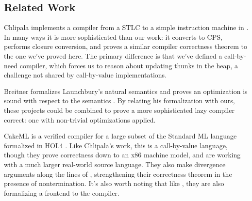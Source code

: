 \subsection{Related Work}

Chlipala implements a compiler from a STLC to a simple instruction machine in
\cite{chlipala2007certified}. In many ways it is more sophisticated than our 
work: it converts to CPS, performs closure conversion, and proves a similar
compiler correctness theorem to the one we've proved here. The primary
difference is that we've defined a call-by-need compiler, which forces us to
reason about updating thunks in the heap, a challenge not shared by
call-by-value implementations.

Breitner formalizes Launchbury's natural semantics and proves an optimization is
sound with respect to the semantics \cite{launchburynatural,breitnerthesis}. By
relating his formalization with ours, these projects could be combined to prove
a more sophisticated lazy compiler correct: one with non-trivial optimizations
applied.

CakeML \cite{cakeml14} is a verified compiler for a large subset of the Standard
ML language formalized in HOL4 \cite{slind2008brief}. Like Chlipala's work, this
is a call-by-value language, though they prove correctness down to an x86
machine model, and are working with a much larger real-world source language.
They also make divergence arguments along the lines of \cite{functionalbigstep},
strengthening their correctness theorem in the presence of nontermination. It's
also worth noting that like \cite{leroy2012compcert}, they are also formalizing
a frontend to the compiler. 


